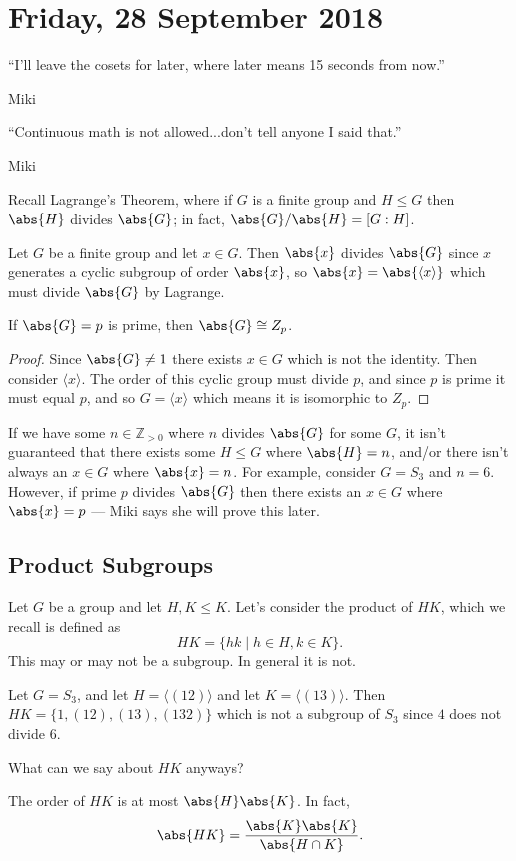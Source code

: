 \section{Friday, 28 September 2018}

\epigraph{``I'll leave the cosets for later, where later means 15 seconds from now.''}{Miki}
\epigraph{``Continuous math is not allowed...don't tell anyone I said that.''}{Miki}

Recall Lagrange's Theorem, where if $G$ is a finite group and $H \leq G$ then $\abs{H}$ divides $\abs{G}$; in fact, $\abs{G} / \abs{H} = [G : H]$.

\begin{corollary}
Let $G$ be a finite group and let $x \in G$. Then $\abs{x}$ divides $\abs{G}$ since $x$ generates a cyclic subgroup of order $\abs{x}$, so $\abs{x} = \abs{\langle x \rangle}$ which must divide $\abs{G}$ by Lagrange.
\end{corollary}

\begin{corollary}
If $\abs{G} = p$ is prime, then $\abs{G} \cong Z_p$.
\end{corollary}

\begin{proof}
Since $\abs{G} \not= 1$ there exists $x \in G$ which is not the identity. Then consider $\langle x \rangle$. The order of this cyclic group must divide $p$, and since $p$ is prime it must equal $p$, and so $G = \langle x \rangle$ which means it is isomorphic to $Z_p$.
\end{proof}

If we have some $n \in \mathbb{Z}_{>0}$ where $n$ divides $\abs{G}$ for some $G$, it isn't guaranteed that there exists some $H \leq G$ where $\abs{H} = n$, and/or there isn't always an $x \in G$ where $\abs{x} = n$. For example, consider $G = S_3$ and $n = 6$. However, if prime $p$ divides $\abs{G}$ then there exists an $x \in G$ where $\abs{x} = p$ --- Miki says she will prove this later.

\subsection{Product Subgroups}

Let $G$ be a group and let $H,K \leq K$. Let's consider the product of $HK$, which we recall is defined as \[ HK = \{ hk \mid h \in H, k \in K \}. \]
This may or may not be a subgroup. In general it is not.
\begin{example}
Let $G = S_3$, and let $H = \langle (12) \rangle$ and let $K = \langle (13) \rangle$. Then $HK = \{1, (12), (13), (132)\}$ which is not a subgroup of $S_3$ since $4$ does not divide $6$.
\end{example}
What can we say about $HK$ anyways?
\begin{proposition}
The order of $HK$ is at most $\abs{H}\abs{K}$. In fact, 
\[ \abs{HK} = \frac{\abs{K}\abs{K}}{\abs{H \cap K}}. \]
\end{proposition}

